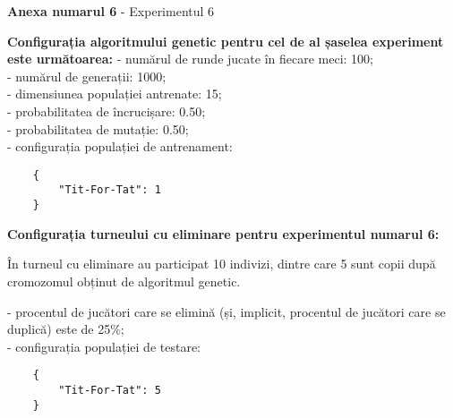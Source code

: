 \clearpage

\begin{center}
	\textbf{Anexa numarul 6} - Experimentul 6
\end{center}

\textbf{Configurația algoritmului genetic pentru cel de al șaselea experiment este următoarea: }
- numărul de runde jucate în fiecare meci: 100;\\
- numărul de generații: 1000;\\
- dimensiunea populației antrenate: 15;\\
- probabilitatea de încrucișare: 0.50;\\
- probabilitatea de mutație: 0.50;\\
- configurația populației de antrenament:\\
\begin{center}
	\begin{lstlisting}
	{
		"Tit-For-Tat": 1
	}
	\end{lstlisting}
\end{center}

\textbf{Configurația turneului cu eliminare pentru experimentul numarul 6: }

În turneul cu eliminare au participat 10 indivizi, dintre care 5 sunt copii după cromozomul obținut de algoritmul genetic. 

- procentul de jucători care se elimină (și, implicit, procentul de jucători care se duplică) este de 25\%;\\
- configurația populației de testare:\\
\begin{center}
	\begin{lstlisting}
	{
		"Tit-For-Tat": 5
	}
	\end{lstlisting}
\end{center}